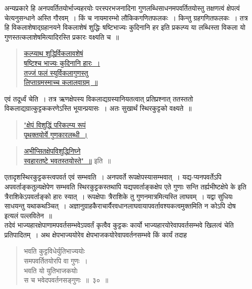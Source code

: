\documentclass[11pt, openany]{book}
\begin{document}
\vspace{-3mm}
 अन्यप्रकारे हि अनपवर्तितयोर्भाज्यहरयोः परस्परभजनादिना गुणलब्धिसाधनमपवर्तितयोस्तु तक्षणत्वं क्षेपत्वं चेत्यनुसन्धाने अस्ति गौरवम्~। 
किं च नायमारम्भो लौकिकगणितफलकः~। किन्तु ग्रहगणितफलकः~। तत्र हि 
विकलाशेषाद्ग्रहानयने विकलाशेषं शुद्धिः षष्टिभाज्यः कुदिनानि हर इति 
प्रकल्प्य या लब्धिस्ता विकला यो गुणस्तत्कलाशेषमित्यादिरस्ति प्रकारः 
वक्ष्यति च~॥ 
\begin{quote}
\hyperref[36]{कल्प्याथ शुद्धिर्विकलावशेषं \\
षष्टिश्च भाज्यः कुदिनानि हारः~। \\
 तज्जं फलं स्युर्विकलागुणस्तु \\
 लिप्ताग्रमस्माच्च कलालवाग्रम्~॥ }
\end{quote}

 एवं तदूर्ध्वं चेति~। तत्र ऋणक्षेपस्य विकलाद्यग्रस्यानियतत्वात् प्रतिप्रश्नात् ततस्ततो विकलाद्यग्रात्कुट्टककरणेऽस्ति भूयान्प्रयासः~। अतः सुखार्थं स्थिरकुट्टको वक्ष्यते~॥ 
\begin{quote}
\hyperref[35]{"क्षेपं विशुद्धिं परिकल्प्य रूपं \\
 पृथक्तयोर्ये गुणकारलब्धी~।}
\end{quote}
\newpage%
\begin{quote}
\hyperref[35]{अभीप्सितक्षेपविशुद्धिनिघ्ने \\
स्वहारतष्टे भवतस्तयोस्ते"~॥} इति~॥ 
\end{quote}

 एतादृशस्थिरकुट्टकस्त्वपवर्त एवं सम्भवति~। अनपवर्ते रूपक्षेपस्यासम्भवात्~। यद्य-प्यनपवर्तेऽपि अपवर्ताङ्कतुल्यक्षेपेण सम्भवति स्थिरकुट्टकस्तथापि यद्यपवर्ताङ्कक्षेप एते गुणाः सन्ति तर्ह्यभीष्टक्षेपे के इति त्रैराशिकेऽपवर्ताङ्को हारः स्यात्~। रूपक्षेपाः त्रैराशिके तु गुणनमात्रमित्यस्ति लाघवम्~। यद्वा सुधियः साधयन्तु यथाकथञ्चित्~। अज्ञानुग्राहकैराचार्यैरवधानलाघवायापवर्तावश्यकत्वमुक्तमिति न कोऽपि दोष इत्यलं पल्लवितेन~॥ \\

\vspace{-3mm}
 तदेवं भाज्यहारक्षेपाणामपवर्तसम्भवेऽपवर्तं कृत्वैव कुट्टकः कार्यो 
भाज्यहारयोरेवापवर्तसम्भवे खिलत्वं चेति प्रतिपादितम्~। अथ क्षेपभाज्ययोरेव क्षेपभाजकयोरेवापवर्तनसम्भवे किं कार्यं तदाह\textendash  

 \label{30}
\begin{quote}
    \bs
     भवति कुट्टविधेर्युतिभाज्ययोः \\

\vspace{-7mm}
\hspace{1cm} समपवर्तितयोरपि वा गुणः~। \\

\vspace{-7mm}
 भवति यो युतिभाजकयोः \\

\vspace{-7mm}
\hspace{1cm} स च भवेदपवर्तनसङ्गुणः~॥~३०~॥ 
\end{quote}
\end{document}
